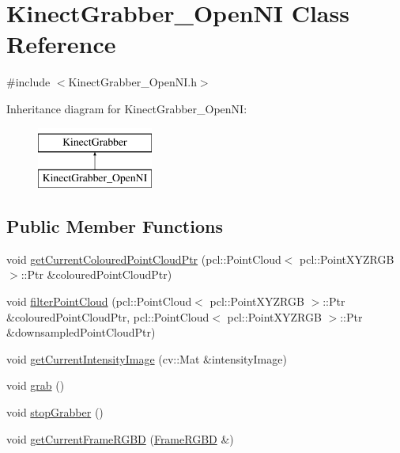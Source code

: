 \hypertarget{class_kinect_grabber___open_n_i}{
\section{KinectGrabber\_\-OpenNI Class Reference}
\label{class_kinect_grabber___open_n_i}
}


{\ttfamily \#include $<$KinectGrabber\_\-OpenNI.h$>$}

Inheritance diagram for KinectGrabber\_\-OpenNI:\begin{figure}[H]
\begin{center}
\leavevmode
\includegraphics[height=2.000000cm]{class_kinect_grabber___open_n_i}
\end{center}
\end{figure}
\subsection*{Public Member Functions}
\begin{DoxyCompactItemize}
\item 
void \hyperlink{class_kinect_grabber___open_n_i_a49fcf8f7d6160a72cae3a8c69663412d}{getCurrentColouredPointCloudPtr} (pcl::PointCloud$<$ pcl::PointXYZRGB $>$::Ptr \&colouredPointCloudPtr)
\item 
void \hyperlink{class_kinect_grabber___open_n_i_a6f3449aae89913eaa1ce2f1d82f2e80c}{filterPointCloud} (pcl::PointCloud$<$ pcl::PointXYZRGB $>$::Ptr \&colouredPointCloudPtr, pcl::PointCloud$<$ pcl::PointXYZRGB $>$::Ptr \&downsampledPointCloudPtr)
\item 
void \hyperlink{class_kinect_grabber___open_n_i_ab06b4b2825042c47facb5a10697b114e}{getCurrentIntensityImage} (cv::Mat \&intensityImage)
\item 
void \hyperlink{class_kinect_grabber___open_n_i_a75b04004b7cfa8a061fbadae7825ade4}{grab} ()
\item 
void \hyperlink{class_kinect_grabber___open_n_i_a5618f02db9a2b8e514bdee738c472ba3}{stopGrabber} ()
\item 
void \hyperlink{class_kinect_grabber___open_n_i_ac85fcc37d21dcd74066af85bf055d66b}{getCurrentFrameRGBD} (\hyperlink{class_frame_r_g_b_d}{FrameRGBD} \&)
\end{DoxyCompactItemize}
